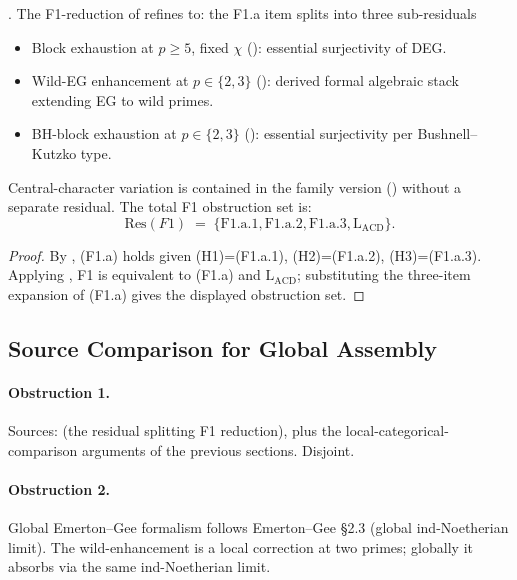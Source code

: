 \begin{proposition}
\label{v4-arith:deg-f1a:prop:F1-reduction-updated}
\ClaimStatusProvedHere. The F1-reduction of
 refines to:
the F1.a item splits into three sub-residuals
\begin{itemize}
\item[\textbf{(F1.a.1)}] Block exhaustion at \(p\geq 5\), fixed \(\chi\)
(): essential
surjectivity of DEG.
\item[\textbf{(F1.a.2)}] Wild-EG enhancement at \(p\in\{2,3\}\)
(): derived
formal algebraic stack extending EG to wild primes.
\item[\textbf{(F1.a.3)}] BH-block exhaustion at \(p\in\{2,3\}\)
():
essential surjectivity per Bushnell--Kutzko type.
\end{itemize}
Central-character variation is contained in the family version
() without a
separate residual. The total F1 obstruction set is:
\begin{equation}
\mathrm{Res}(F1)\;=\;\{\text{F1.a.1},\text{F1.a.2},\text{F1.a.3},\mathrm{L}_{\mathrm{ACD}}\}.
\end{equation}
\end{proposition}

\begin{proof}
By , (F1.a) holds given
(H1)=(F1.a.1), (H2)=(F1.a.2), (H3)=(F1.a.3). Applying
, F1 is equivalent to (F1.a) and
\(\mathrm{L}_{\mathrm{ACD}}\); substituting the three-item expansion
of (F1.a) gives the displayed obstruction set.
\end{proof}

\subsection{Source Comparison for Global Assembly}

\paragraph{Obstruction 1.} Sources: 
(the residual splitting F1 reduction), plus the local-categorical-comparison
arguments of the previous sections. Disjoint.

\paragraph{Obstruction 2.} Global Emerton--Gee formalism follows
Emerton--Gee \S 2.3 (global ind-Noetherian limit). The
wild-enhancement is a local correction at two primes; globally it
absorbs via the same ind-Noetherian limit.

